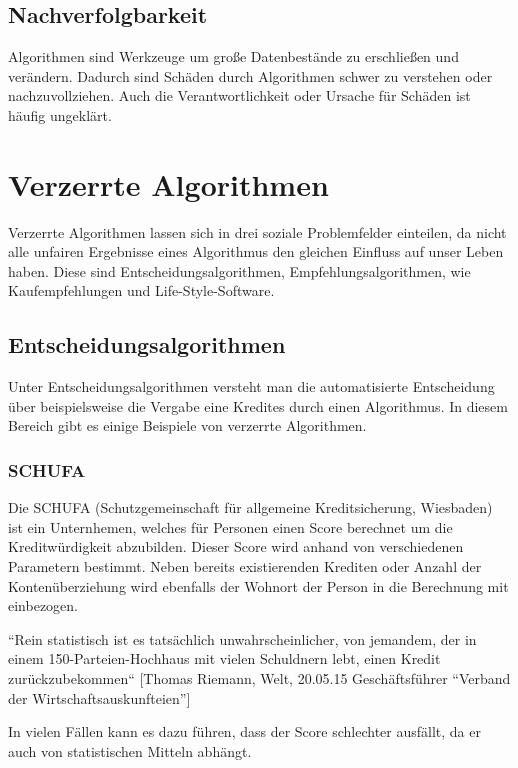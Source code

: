 \subsection{Nachverfolgbarkeit}
Algorithmen sind Werkzeuge um große Datenbestände zu erschließen und verändern. Dadurch sind Schäden durch Algorithmen schwer zu verstehen oder nachzuvollziehen. Auch die Verantwortlichkeit oder Ursache für Schäden ist häufig ungeklärt.

\section{Verzerrte Algorithmen}

Verzerrte Algorithmen lassen sich in drei soziale Problemfelder einteilen, da nicht alle unfairen Ergebnisse eines Algorithmus den gleichen Einfluss auf unser Leben haben. 
Diese sind Entscheidungsalgorithmen, Empfehlungsalgorithmen, wie Kaufempfehlungen und Life-Style-Software.


\subsection{Entscheidungsalgorithmen}
Unter Entscheidungsalgorithmen versteht man die automatisierte Entscheidung über beispielsweise die Vergabe eine Kredites durch einen Algorithmus. In diesem Bereich gibt es einige Beispiele von verzerrte Algorithmen. 

\subsubsection{SCHUFA}
Die SCHUFA (Schutzgemeinschaft für allgemeine Kreditsicherung, Wiesbaden) ist ein Unternhemen, welches für Personen einen Score berechnet um die Kreditwürdigkeit abzubilden. Dieser Score wird anhand von verschiedenen Parametern bestimmt. Neben bereits existierenden Krediten oder Anzahl der Kontenüberziehung wird ebenfalls der Wohnort der Person in die Berechnung mit einbezogen. \newline

“Rein statistisch ist es tatsächlich unwahrscheinlicher, von jemandem, der in einem 150-Parteien-Hochhaus mit vielen Schuldnern lebt, einen Kredit zurückzubekommen“
[Thomas Riemann, Welt, 20.05.15 Geschäftsführer “Verband der Wirtschaftsauskunfteien”]

In vielen Fällen kann es dazu führen, dass der Score schlechter ausfällt, da er auch von statistischen Mitteln abhängt. 


